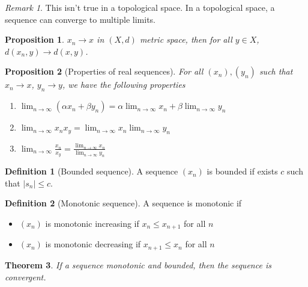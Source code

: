 \documentclass{article}
\newcommand{\DS}{\displaystyle}
\newcommand{\abs}[1]{\left|#1\right|}
\newenvironment{enumrom}{\begin{enumerate}[label=(\roman*)]}{\end{enumerate}}
\newcommand{\fr}[2]{\frac{#1}{#2}}
\newcommand{\limn}{\lim_{n \to \infty}}
\theoremstyle{definition}
\newtheorem{definition}{Definition}[section]
\theoremstyle{definition}
\theoremstyle{plain}
\newtheorem{theorem}{Theorem}[section]
\theoremstyle{plain}
\theoremstyle{plain}
\theoremstyle{plain}
\newtheorem{proposition}[theorem]{Proposition}
\theoremstyle{definition}
\theoremstyle{remark}
\theoremstyle{remark}
\theoremstyle{remark}
\theoremstyle{remark}
\newtheorem*{remark}{Remark}
\begin{document}
\begin{remark}
  This isn't true in a topological space. In a topological space, a sequence can converge to multiple limits.
\end{remark}


\begin{proposition}
  $x_n \to x$ in $(X,d)$ metric space, then for all $y \in X$, $d(x_n,y) \to d(x,y)$.
\end{proposition}


\begin{proposition}[Properties of real sequences]
  For all $(x_n), (y_n)$ such that $x_n \to x$, $y_n \to y$, we have the following properties
  \begin{enumrom}
  \item $\DS \limn (\alpha x_n + \beta y_n) = \alpha \limn x_n + \beta \limn y_n$
  \item $\DS \limn x_n x_y = \limn x_n \limn y_n$
  \item $\DS \limn \fr{x_n}{x_y} = \fr{\limn x_n}{\limn y_n}$
  \end{enumrom}
\end{proposition}





\begin{definition}[Bounded sequence]
  A sequence $(x_n)$ is bounded if exists $c$ such that $\abs{s_n} \leq c$.
\end{definition}





\begin{definition}[Monotonic sequence]
  A sequence is monotonic if
  \begin{itemize}
    \item $(x_n)$ is monotonic increasing if $x_n \leq x_{n+1}$ for all $n$
    \item $(x_n)$ is monotonic decreasing if $x_{n+1} \leq x_n$ for all $n$
  \end{itemize}
\end{definition}





\begin{theorem}
  If a sequence monotonic and bounded, then the sequence is convergent.
\end{theorem}
\end{document}
